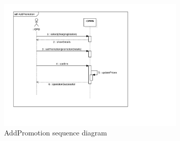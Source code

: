 \begin{figure}[H]
    \centering
    \includegraphics[width=0.8\textwidth, trim={0 3cm 6cm 0}, clip]{Images/cp3/seqDiagrams/AddPromotion.pdf}
    \caption{AddPromotion sequence diagram}
\end{figure}

